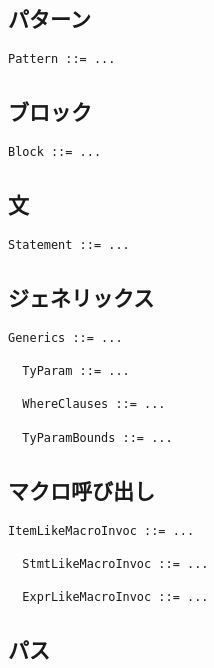 \documentclass[dvipdfmx,uplatex,papersize,a4paper,10pt]{jsbook}
\theoremstyle{definition}
\begin{document}
\subsection{パターン}

\begin{lstlisting}[language=BNFLike, gobble=2]
  Pattern ::= ...
\end{lstlisting}

\subsection{ブロック}

\begin{lstlisting}[language=BNFLike, gobble=2]
  Block ::= ...
\end{lstlisting}

\subsection{文}

\begin{lstlisting}[language=BNFLike, gobble=2]
  Statement ::= ...
\end{lstlisting}

\subsection{ジェネリックス}

\begin{lstlisting}[language=BNFLike, gobble=2]
  Generics ::= ...

  TyParam ::= ...

  WhereClauses ::= ...

  TyParamBounds ::= ...
\end{lstlisting}

\subsection{マクロ呼び出し}

\begin{lstlisting}[language=BNFLike, gobble=2]
  ItemLikeMacroInvoc ::= ...

  StmtLikeMacroInvoc ::= ...

  ExprLikeMacroInvoc ::= ...
\end{lstlisting}

\subsection{パス}
\end{document}
